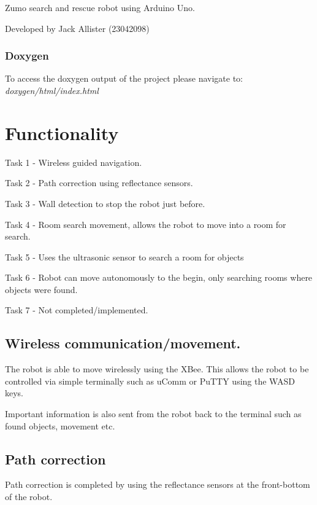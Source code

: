 Zumo search and rescue robot using Arduino Uno.

Developed by Jack Allister (23042098)

\subsubsection*{Doxygen}

To access the doxygen output of the project please navigate to\+: {\itshape doxygen/html/index.\+html}

\section*{Functionality}


\begin{DoxyItemize}
\item Task 1 -\/ Wireless guided navigation.
\item Task 2 -\/ Path correction using reflectance sensors.
\item Task 3 -\/ Wall detection to stop the robot just before.
\item Task 4 -\/ Room search movement, allows the robot to move into a room for search.
\item Task 5 -\/ Uses the ultrasonic sensor to search a room for objects
\item Task 6 -\/ Robot can move autonomously to the begin, only searching rooms where objects were found.
\item Task 7 -\/ Not completed/implemented.
\end{DoxyItemize}

\subsection*{Wireless communication/movement.}

The robot is able to move wirelessly using the X\+Bee. This allows the robot to be controlled via simple terminally such as u\+Comm or Pu\+T\+T\+Y using the W\+A\+S\+D keys.

Important information is also sent from the robot back to the terminal such as found objects, movement etc.

\subsection*{Path correction}

Path correction is completed by using the reflectance sensors at the front-\/bottom of the robot.

